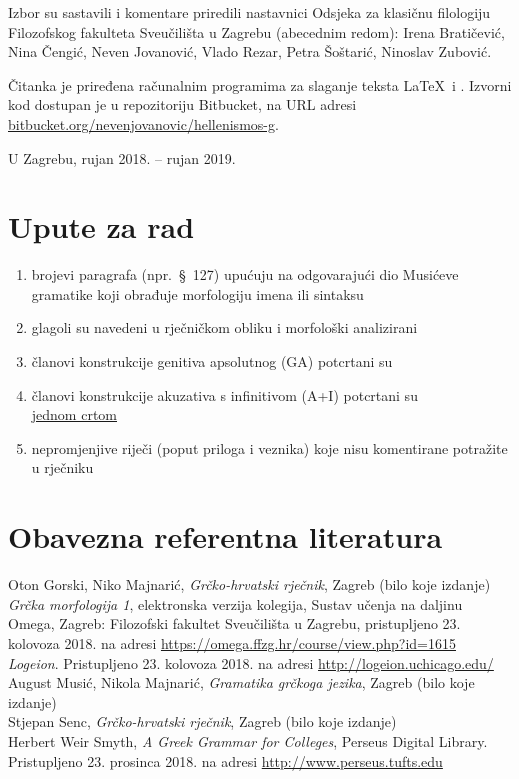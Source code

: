 \documentclass[a4paper,12pt,twoside]{report}
\begin{document}
\newpage

Izbor su sastavili i komentare priredili nastavnici Odsjeka za klasičnu filologiju Filozofskog fakulteta Sveučilišta u Zagrebu (abecednim redom): Irena Bratičević, Nina Čengić, Neven Jovanović, Vlado Rezar, Petra Šoštarić, Ninoslav Zubović.

Čitanka je priređena računalnim programima za slaganje teksta \LaTeX\ i \XeLaTeX. Izvorni kod dostupan je u repozitoriju Bitbucket, na URL adresi \href{https://bitbucket.org/nevenjovanovic/hellenismos-g}{bitbucket.org/nevenjovanovic/hellenismos-g}.

\medskip

U Zagrebu, rujan 2018. – rujan 2019.

\newpage



\section*{Upute za rad}

\begin{enumerate}[label=\alph*)]
\item brojevi paragrafa (npr.\ §~127) upućuju na odgovarajući dio Musićeve gramatike koji obrađuje morfologiju imena ili sintaksu
\item glagoli su navedeni u rječničkom obliku i morfološki analizirani
\item članovi konstrukcije genitiva apsolutnog (GA) potcrtani su \\
\item članovi konstrukcije akuzativa s infinitivom (A+I) potcrtani su \\ \underline{jednom crtom}
\item nepromjenjive riječi (poput priloga i veznika) koje nisu komentirane potražite u rječniku
\end{enumerate}


\section*{Obavezna referentna literatura}

Oton Gorski, Niko Majnarić, \textit{Grčko-hrvatski rječnik}, Zagreb (bilo koje izdanje)\\
\textit{Grčka morfologija 1}, elektronska verzija kolegija, Sustav učenja na daljinu Omega, Zagreb: Filozofski fakultet Sveučilišta u Zagrebu, pristupljeno 23. kolovoza 2018. na adresi \url{https://omega.ffzg.hr/course/view.php?id=1615}\\
\textit{Logeion}. Pristupljeno 23. kolovoza 2018. na adresi \url{http://logeion.uchicago.edu/}\\
August Musić, Nikola Majnarić, \textit{Gramatika grčkoga jezika}, Zagreb (bilo koje izdanje)\\
Stjepan Senc, \textit{Grčko-hrvatski rječnik}, Zagreb (bilo koje izdanje)\\
Herbert Weir Smyth, \textit{A Greek Grammar for Colleges}, Perseus Digital Library. Pristupljeno 23. prosinca 2018. na adresi \url{http://www.perseus.tufts.edu}\\
\end{document}

